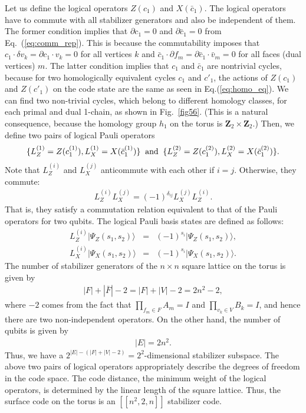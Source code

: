 Let us define the logical operators $Z(c_1)$ and $X(\bar c_1)$.
The logical operators have to commute with all stabilizer generators and also be independent of them.
The former condition implies that $\partial c_1 =0$ and $\partial \bar c_1=0$ from Eq.\ (\ref{eq:comm_rep}).
This is because the commutability imposes that $c_1 \cdot \delta v_k = \partial c_1 \cdot v_k =0$ for all vertices $k$ and 
$\bar c_1 \cdot \partial f_m = \partial \bar c_1 \cdot \bar v_m=0$ for all faces (dual vertices) $m$.
The latter condition implies that $c_1$ and $\bar c_1$ are nontrivial cycles, because for two homologically equivalent cycles $c_1$ and $c'_1$, the actions of $Z(c_1)$ and $Z(c'_1)$ on the code state are the same
as seen in Eq.(\ref{eq:homo_eq}).
We can find two non-trivial cycles, which belong to different homology classes, for each primal and dual 1-chain, as shown in Fig.~\ref{fig56}.
(This is a natural consequence, because the homology group $h_1$ on the torus is $\mathbf{Z}_2 \times \mathbf{Z}_2$.)
Then, we define two pairs of logical Pauli operators
\begin{eqnarray}
\{ L_Z^{(1)}=Z(c_1^{(1)}), L_X^{(1)}=X(\bar c_1^{(1)})\}
\;\; {\rm and} \;\;
\{ L_Z^{(2)}=Z(c_1^{(2)}), L_X^{(2)}=X(\bar c_1^{(2)})\}.
\end{eqnarray}
Note that $L_Z^{(i)}$ and $L_X^{(j)}$ anticommute with each other if $i=j$.
Otherwise, they commute:
\begin{eqnarray}
L_Z^{(i)}L_X^{(j)} = (-1)^{\delta _{ij}} L_X^{(j)}L_Z^{(i)}.
\end{eqnarray}
That is, they satisfy a commutation relation equivalent to that of the Pauli operators for two qubits.
The logical Pauli basis states are defined as follows:
\begin{eqnarray}
L_Z^{(i)} | \Psi _Z (s_1 ,s_2)\rangle &=& (-1)^{s_i}| \Psi _Z (s_1 ,s_2)\rangle ,
\\
L_X^{(i)} | \Psi _X (s_1 ,s_2)\rangle &=& (-1)^{s_i}| \Psi _X (s_1 ,s_2)\rangle .
\end{eqnarray}
The number of stabilizer generators of the $n \times n$ square lattice on the torus is given by 
\begin{eqnarray}
|F|+|\bar F|-2=|F|+|V|-2=2n^2-2,
\end{eqnarray}
where $-2$ comes from the fact that $\prod_{f_m \in F} A_m=I$ and $\prod_{v_k \in V} B_k=I$, and hence there are two non-independent operators.
On the other hand, the number of qubits is given by 
\begin{eqnarray}
|E| = 2 n^2.
\end{eqnarray}
Thus, we have a $2^{|E|-(|F|+|V|-2)}=2^{2}$-dimensional stabilizer subspace.
The above two pairs of logical operators appropriately describe the degrees of freedom in the code space.
The code distance, the minimum weight of the logical operators, is determined by the linear length of the square lattice.
Thus, the surface code on the torus is an $[[n^2,2,n]]$ stabilizer code.


